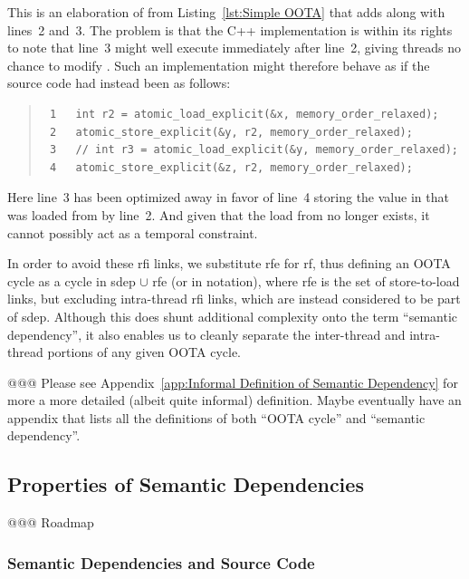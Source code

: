 \documentclass[10]{article}
\begin{document}
This is an elaboration of  from
Listing~\ref{lst:Simple OOTA}
that adds  along with lines~2 and~3.
The problem is that the C++ implementation is within its rights to
note that line~3 might well execute immediately after line~2, giving
threads no chance to modify .
Such an implementation might therefore behave as if the source code
had instead been as follows:

\begin{quote}
\scriptsize
\begin{verbatim}
 1   int r2 = atomic_load_explicit(&x, memory_order_relaxed);
 2   atomic_store_explicit(&y, r2, memory_order_relaxed);
 3   // int r3 = atomic_load_explicit(&y, memory_order_relaxed);
 4   atomic_store_explicit(&z, r2, memory_order_relaxed);
\end{verbatim}
\end{quote}

Here line~3 has been optimized away in favor of line~4 storing the value
in  that was loaded from  by line~2.
And given that the load from  no longer exists, it cannot possibly
act as a temporal constraint.

In order to avoid these rfi links, we substitute rfe
for rf, thus defining an OOTA cycle as a cycle in sdep $\cup$ rfe (or
 in  notation), where rfe is the set
of store-to-load links, but excluding intra-thread rfi links, which are
instead considered to be part of sdep.
Although this does shunt additional complexity onto the term
``semantic dependency'', it also enables us to cleanly separate
the inter-thread and intra-thread portions of any given OOTA cycle.

@@@ Please see
Appendix~\ref{app:Informal Definition of Semantic Dependency}
for more a more detailed (albeit quite informal) definition.
Maybe eventually have an appendix that lists all the definitions
of both ``OOTA cycle'' and ``semantic dependency''.

\subsection{Properties of Semantic Dependencies}
\label{sec:Properties of Semantic Dependencies}

@@@ Roadmap

\subsubsection{Semantic Dependencies and Source Code}
\label{sec:Semantic Dependencies and Source Code}
\end{document}
